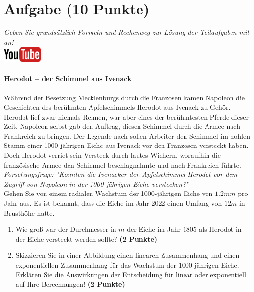\documentclass[a4paper, 9pt]{scrartcl}\usepackage[]{graphicx}\usepackage[]{xcolor}
\begin{document}
\section{Aufgabe \hfill (10 Punkte)}

\textit{Geben Sie grunds{\"a}tzlich Formeln und Rechenweg zur L{\"o}sung der
  Teilaufgaben mit an!} \\[1Ex]

\hfill\href{https://youtu.be/Fu8kN0Uj13Y}{\includegraphics[width =
  2cm]{img/youtube}} %
\hspace{2Ex}

\paragraph{Herodot – der Schimmel aus Ivenack}

W{\"a}hrend der Besetzung Mecklenburgs durch die Franzosen kamen Napoleon die
Geschichten des ber{\"u}hmten Apfelschimmels Herodot aus Ivenack zu
Geh{\"o}r. Herodot lief zwar niemals Rennen, war aber eines der ber{\"u}hmtesten
Pferde dieser Zeit. Napoleon selbst gab den Auftrag, diesen
Schimmel durch die Armee nach Frankreich zu bringen. Der Legende nach
sollen Arbeiter den Schimmel im hohlen Stamm einer 1000-j{\"a}hrigen Eiche aus Ivenack vor
den Franzosen versteckt haben. Doch Herodot verriet sein Versteck durch
lautes Wiehern, woraufhin die franz{\"o}sische Armee den Schimmel
beschlagnahmte und nach Frankreich f{\"u}hrte. \\



\textit{Forschungsfrage: "Konnten die Ivenacker den Apfelschimmel Herodot
  vor dem Zugriff von Napoleon in der 1000-j{\"a}hrigen Eiche verstecken?"} \\

Gehen Sie von einem radialen Wachstum der 1000-j{\"a}hrigen Eiche von
$1.2mm$ pro Jahr aus. Es ist bekannt, dass die Eiche im
Jahr 2022 einen Umfang von $12m$ in Brusth{\"o}he hatte.

\begin{enumerate}
\item Wie gro{\ss} war der Durchmesser in $m$ der Eiche im Jahr $1805$ als
  Herodot in der Eiche versteckt werden sollte?
  \textbf{(2 Punkte)}
\item Skizzieren Sie in einer Abbildung einen linearen Zusammenhang und einen
exponentiellen Zusammenhang f{\"u}r das Wachstum der 1000-j{\"a}hrigen Eiche. Erkl{\"a}ren Sie die
Auswirkungen der Entscheidung f{\"u}r linear oder exponentiell auf Ihre
Berechnungen! \textbf{(2 Punkte)}
\end{enumerate}
 
\end{document}
